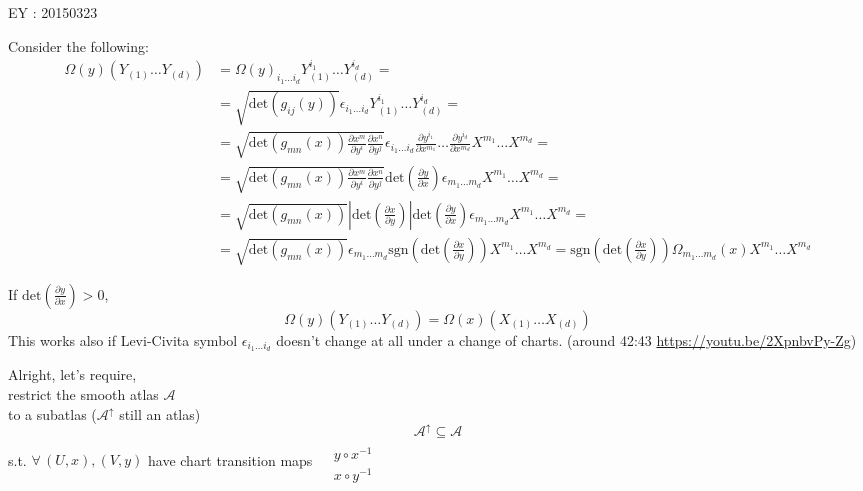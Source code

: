 \documentclass[10pt, twoside]{amsart}
\begin{document}
\begin{multicols*}{2}
EY : 20150323 

Consider the following:
\[
\begin{aligned}
\Omega(y)(Y_{(1)} \dots Y_{(d)} ) & = \Omega(y)_{i_1 \dots i_d}Y_{(1)}^{i_1} \dots Y_{(d)}^{i_d} =  \\
& = \sqrt{ \text{det}(g_{ij}(y)) } \epsilon_{i_1 \dots i_d} Y^{i_1}_{(1)} \dots Y^{i_d}_{(d)} = \\
& = \sqrt{ \text{det}(g_{mn}(x)) \frac{ \partial x^m}{ \partial y^i} \frac{ \partial x^n }{ \partial y^j} } \epsilon_{i_1 \dots i_d} \frac{ \partial y^{i_1}}{ \partial x^{m_1} } \dots \frac{ \partial y^{i_d} }{ \partial x^{m_d} } X^{m_1} \dots X^{m_d}  = \\
& = \sqrt{ \text{det}(g_{mn}(x))\frac{ \partial x^m}{ \partial y^i} \frac{ \partial x^n}{ \partial y^j}} \text{det}\left( \frac{ \partial y}{ \partial x}\right) \epsilon_{m_1 \dots m_d} X^{m_1} \dots X^{m_d} = \\
& = \sqrt{ \text{det}(g_{mn}(x)) } \left| \text{det}\left( \frac{ \partial x}{ \partial y} \right) \right| \text{det}\left( \frac{ \partial y}{ \partial x} \right) \epsilon_{m_1 \dots m_d} X^{m_1} \dots X^{m_d} = \\
& = \sqrt{\text{det}(g_{mn}(x))} \epsilon_{m_1 \dots m_d} \text{sgn}\left(\text{det}\left( \frac{ \partial x}{ \partial y} \right) \right) X^{m_1} \dots X^{m_d} = \text{sgn}(\text{det}\left( \frac{ \partial x}{ \partial y} \right)) \Omega_{m_1 \dots m_d}(x) X^{m_1} \dots X^{m_d}
\end{aligned}
\]

If $\text{det}\left( \frac{ \partial y}{ \partial x} \right) > 0$, 
\[
\Omega(y)(Y_{(1)} \dots Y_{(d)})  = \Omega(x)(X_{(1)} \dots X_{(d)} )
\]
This works also if Levi-Civita symbol $\epsilon_{i_1\dots i_d}$ doesn't change at all under a change of charts. (around 42:43 \url{https://youtu.be/2XpnbvPy-Zg})

\hrulefill

Alright, let's require, \\
\phantom{\quad \, } restrict the smooth atlas $\mathcal{A}$ \\
\phantom{\quad \quad \, } to a subatlas ($\mathcal{A}^{\uparrow}$ still an atlas) 
\[
\mathcal{A}^{\uparrow} \subseteq \mathcal{A}
\]
s.t. $\forall \, (U,x), (V,y)$ have chart transition maps $\begin{aligned} & \quad \\ 
& y\circ x^{-1} \\ 
& x\circ y^{-1} \end{aligned}$


\end{multicols*}
\end{document}
